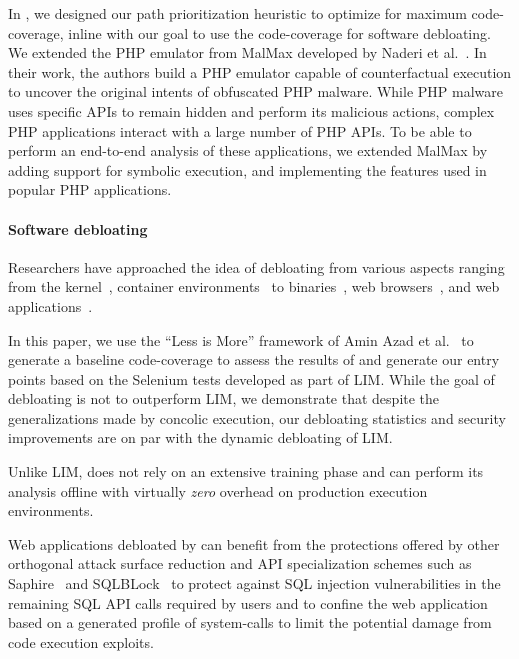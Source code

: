 In \animatedead{}, we designed our path prioritization heuristic to optimize for maximum code-coverage, inline with our goal to use the code-coverage for software debloating. 
We extended the PHP emulator from MalMax developed by Naderi et al.~\cite{naderi2019malmax,naderi2019cubismo}. 
In their work, the authors build a PHP emulator capable of counterfactual execution to uncover the original intents of obfuscated PHP malware. 
While PHP malware uses specific APIs to remain hidden and perform its malicious actions, complex PHP applications interact with a large number of PHP APIs. 
To be able to perform an end-to-end analysis of these applications, we extended MalMax by adding support for symbolic execution, and implementing the features used in popular PHP applications. 

\paragraph{Software debloating} 
Researchers have approached the idea of debloating from various aspects ranging from the kernel~\cite{abubakar2021shard}, container environments~\cite{rastogi2017cimplifier, 259711} to binaries~\cite{hasan2022decap, redini2019b, heo2018effective, ghavamnia2020temporal, mishra2020saffire, koo2019configuration, quach2018debloating}, web browsers~\cite{snyder2017most, qian2020slimium}, and web applications~\cite{azad2019less, bulekov2021saphire, mininode, jahanshahi2020you}.

In this paper, we use the ``Less is More'' framework of Amin Azad et al.~\cite{azad2019less} to generate a baseline code-coverage to assess the results of \animatedead{} and generate our entry points based on the Selenium tests developed as part of LIM. 
While the goal of \animatedead{} debloating is not to outperform LIM, we demonstrate that despite the generalizations made by concolic execution, our debloating statistics and security improvements are on par with the dynamic debloating of LIM. 

Unlike LIM, \animatedead{} does not rely on an extensive training phase and can perform its analysis offline with virtually \emph{zero} overhead on production execution environments. 

Web applications debloated by \animatedead{} can benefit from the protections offered by other orthogonal attack surface reduction and API specialization schemes such as Saphire~\cite{bulekov2021saphire} and SQLBLock~\cite{jahanshahi2020you} to protect against SQL injection vulnerabilities in the remaining SQL API calls required by users and to confine the web application based on a generated profile of system-calls to limit the potential damage from code execution exploits.

